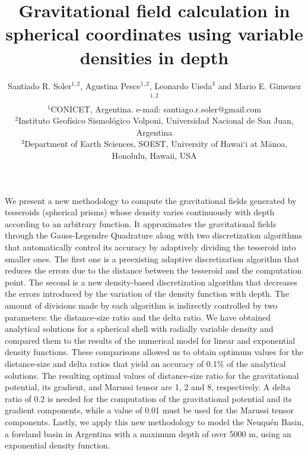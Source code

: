 \documentclass[extra]{gji}
\begin{document}
\title[Variable Density Tesseroids]{
    Gravitational field calculation in spherical coordinates using variable
    densities in depth
}
\author[S.R. Soler, A. Pesce, L. Uieda and M.E. Gimenez]{
    Santiado R. Soler$^{1,2}$, Agustina Pesce$^{1,2}$, Leonardo Uieda$^3$ and
    Mario E. Gimenez$^{1,2}$ \\
    $^1$CONICET, Argentina. e-mail: santiago.r.soler@gmail.com\\
    $^2$Instituto Geofísico Sismológico Volponi, Universidad Nacional de
    San Juan, Argentina\\
    $^3$Department of Earth Sciences, SOEST, University of Hawai‘i at
    M\={a}noa, Honolulu, Hawaii, USA
}


\maketitle

\begin{summary}
We present a new methodology to compute the gravitational fields generated by
tesseroids (spherical prisms) whose density varies continuously with depth according to
an arbitrary function.
It approximates the gravitational fields through the Gauss-Legendre Quadrature along
with two discretization algorithms that automatically control its accuracy by adaptively
dividing the tesseroid into smaller ones.
The first one is a preexisting adaptive discretization algorithm that reduces
the errors due to the distance between the tesseroid and the computation
point.
The second is a new density-based discretization algorithm that
decreases the errors introduced by the variation of the density function with depth.
The amount of divisions made by each algorithm is indirectly controlled
by two parameters: the distance-size ratio and the delta ratio.
We have obtained analytical solutions for a spherical shell with radially variable
density and compared them to the results of the numerical model for linear and
exponential density functions.
These comparisons allowed us to obtain optimum values for the distance-size and
delta ratios that yield an accuracy of 0.1\% of the analytical solutions.
The resulting optimal values of distance-size ratio for the gravitational potential, its
gradient, and Marussi tensor are 1, 2 and 8, respectively.
A delta ratio of 0.2 is needed for the computation of the gravitational potential and
its gradient components, while a value of 0.01 must be used for the Marussi tensor
components.
Lastly, we apply this new methodology to model the Neuqu\'en Basin, a foreland basin in
Argentina with a maximum depth of over 5000 m, using an exponential density function.
\end{summary}
\end{document}
